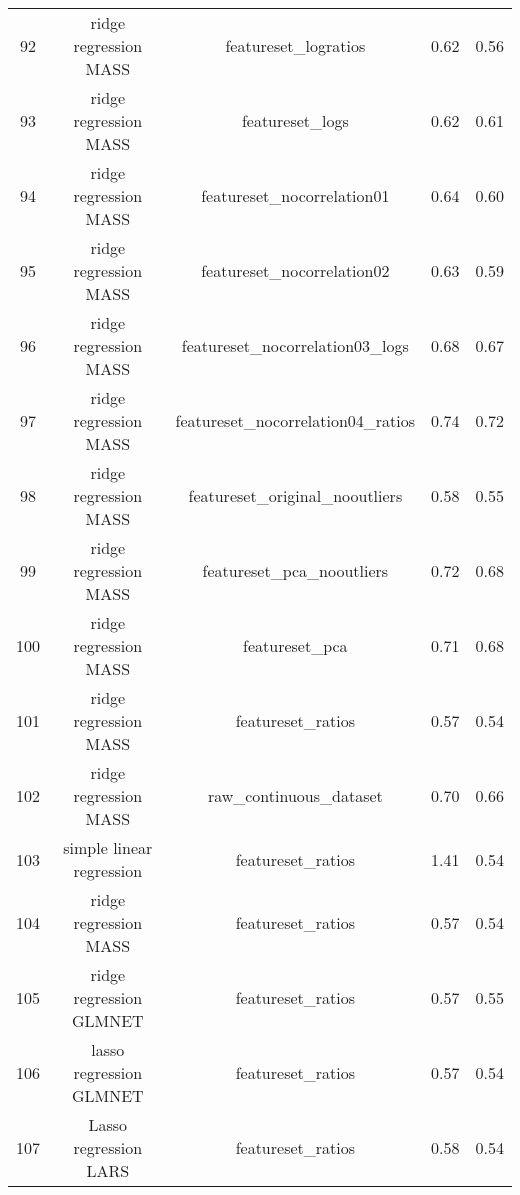 \begin{tabular}{ccccc}
  92 & ridge regression MASS & featureset\_logratios & 0.62 & 0.56 \\ 
  93 & ridge regression MASS & featureset\_logs & 0.62 & 0.61 \\ 
  94 & ridge regression MASS & featureset\_nocorrelation01 & 0.64 & 0.60 \\ 
  95 & ridge regression MASS & featureset\_nocorrelation02 & 0.63 & 0.59 \\ 
  96 & ridge regression MASS & featureset\_nocorrelation03\_logs & 0.68 & 0.67 \\ 
  97 & ridge regression MASS & featureset\_nocorrelation04\_ratios & 0.74 & 0.72 \\ 
  98 & ridge regression MASS & featureset\_original\_nooutliers & 0.58 & 0.55 \\ 
  99 & ridge regression MASS & featureset\_pca\_nooutliers & 0.72 & 0.68 \\ 
  100 & ridge regression MASS & featureset\_pca & 0.71 & 0.68 \\ 
  101 & ridge regression MASS & featureset\_ratios & 0.57 & 0.54 \\ 
  102 & ridge regression MASS & raw\_continuous\_dataset & 0.70 & 0.66 \\ 
  103 & simple linear regression & featureset\_ratios & 1.41 & 0.54 \\ 
  104 & ridge regression MASS & featureset\_ratios & 0.57 & 0.54 \\ 
  105 & ridge regression GLMNET & featureset\_ratios & 0.57 & 0.55 \\ 
  106 & lasso regression GLMNET & featureset\_ratios & 0.57 & 0.54 \\ 
  107 & Lasso regression LARS & featureset\_ratios & 0.58 & 0.54 \\ 
   \hline
\end{tabular}
